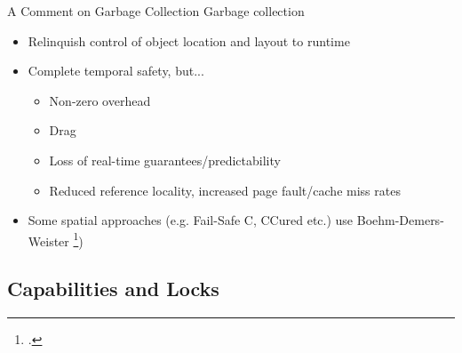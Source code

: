 \documentclass[aspectratio=169]{beamer}
\begin{document}
\begin{frame}{A Comment on Garbage Collection}
Garbage collection
\pause
    \begin{itemize}[<+->]
        \item Relinquish control of object location and layout to runtime 
        \item Complete temporal safety, but...
        \begin{itemize}
            \item Non-zero overhead
            \item Drag
            \item Loss of real-time guarantees/predictability
            \item Reduced reference locality, increased page fault/cache miss rates
        \end{itemize}
        \item Some spatial approaches (e.g. Fail-Safe C, CCured etc.) use Boehm-Demers-Weister \footcite{boehm_garbage_1988})
    \end{itemize}
\end{frame}

\subsection{Capabilities and Locks}
\end{document}
